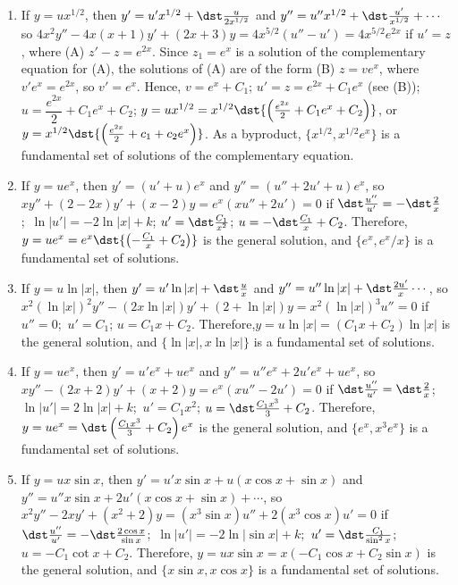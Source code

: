\documentclass[openany]{book}
\newenvironment{sectionSolutions}{
 \begin{enumerate}[item-label={\thesection.\arabic{enumi}.}]
}{
 \end{enumerate}
}
\begin{document}
\begin{sectionSolutions}
\item
If $y=ux^{1/2}$, then $y'=u'x^{1/2}+\dst\frac{u}{2x^{1/2}}$ and
$y''=u''x^{1/2}+\dst\frac{u'}{ x^{1/2}}+\cdots$ so
$4x^2y''-4x(x+1)y'+(2x+3)y=4x^{5/2}(u''-u')=4x^{5/2}e^{2x}$ if $u'=z$,
where (A) $z'-z=e^{2x}$. Since $z_1=e^x$ is a solution of the
complementary equation for (A), the solutions of (A) are of the form
(B) $z=ve^x$, where $v'e^x=e^{2x}$, so $v'=e^x$. Hence, $v=e^x+C_1$;\;
$u'=z=e^{2x}+C_1e^x$ (see (B));\ $u=\dfrac{e^{2x}}{2}+C_1e^x+C_2$;\;
$y=ux^{1/2}=x^{1/2}\dst{\left(\frac{e^{2x}}{2}+C_1e^x+C_2\right)}$, or
$y=x^{1/2}\dst{\left(\frac{e^{2x}}{2}+c_1+c_2e^x\right)}$. As a
byproduct, $\{x^{1/2},x^{1/2}e^x\}$ is a fundamental set of solutions
of the complementary equation.


\item
If $y=ue^x$, then $y'=(u'+u)e^x$ and $y''=(u''+2u'+u)e^x$, so
$xy''+(2-2x)y'+(x-2)y=e^x(xu''+2u')=0$ if $\dst\frac{u''}{
u'}=-\dst\frac{2}{ x}$;\ $\ln|u'|=-2\ln|x|+k$; $u'=\dst\frac{C_1}{ x^2}$;\;
$u=-\dst\frac{C_1}{ x}+C_2$. Therefore,$y=ue^x=e^x\dst{\left(-\frac{C_1}{
x}+C_2\right)}$ is the general solution, and $\{e^x,e^x/x\}$ is a
fundamental set of solutions.


\item
If $y=u\ln|x|$, then $y'=u'\ln|x|+\dst\frac{u}{ x}$ and
$y''=u''\ln|x|+\dst\frac{2u'}{ x}\cdots$, so $x^2(\ln |x|)^2y''-(2x \ln
|x|)y'+(2+\ln |x|)y=x^2(\ln|x|)^3u''=0$ if $u''=0$;\ $u'=C_1$;\;
$u=C_1x+C_2$. Therefore,$y=u\ln|x|=(C_1x+C_2)\ln|x|$ is the general
solution, and $\{\ln|x|,x\ln|x|\}$ is a fundamental set of solutions.


\item
If $y=ue^x$, then $y'=u'e^x+ue^x$ and $y''=u''e^x+2u'e^x+ue^x$, so
$xy''-(2x+2)y'+(x+2)y=e^x(xu''-2u')=0$ if $\dst\frac{u''}{
u'}=\dst\frac{2}{ x}$;\ $\ln|u'|=2\ln|x|+k$;\ $u'=C_1x^2$;\;
$u=\dst\frac{C_1x^3}{3}+C_2$. Therefore,
$y=ue^x=\dst\left(\frac{C_1x^3}{3}+C_2\right)e^x$ is the general
solution, and $\{e^x,x^3e^x\}$ is a fundamental set of solutions.


\item
If $y=ux\sin x$, then $y'=u'x\sin x+u(x\cos x+\sin x)$ and
$y''=u''x\sin x+2u'(x\cos x+\sin x)+\cdots$, so
$x^2y''-2xy'+(x^2+2)y=(x^3\sin x)u''+2(x^3\cos x)u'=0$ if
$\dst\frac{u''}{ u'}=-\dst\frac{2\cos x}{\sin x}$;\ $\ln|u'|=-2\ln|\sin
x|+k$;\ $u'=\dst\frac{C_1}{\sin^2x}$;\ $u=-C_1\cot x+C_2$. Therefore,
$y=ux\sin x=x(-C_1\cos x+C_2\sin x)$ is the general solution, and
$\{x\sin x,x\cos x\}$ is a fundamental set of solutions.



\end{sectionSolutions}
\end{document}

